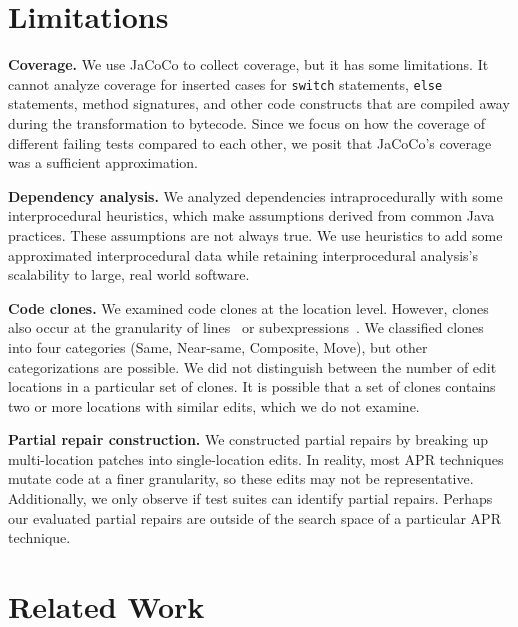 \documentclass[10pt, conference]{IEEEtran}
\begin{document}
\section{Limitations}
\label{sec:limits}

\noindent\textbf{Coverage.}
We use JaCoCo to collect coverage, but it has some
limitations. It cannot analyze coverage for inserted
cases for \texttt{switch} statements, \texttt{else} statements, method
signatures, and other code constructs that are compiled away during the
transformation to bytecode. Since we focus on how the coverage of different
failing tests compared to each other, we posit that JaCoCo's coverage was a
sufficient approximation.

\vspace{1ex}
\noindent\textbf{Dependency analysis.}
We analyzed dependencies intraprocedurally with some interprocedural 
heuristics, which make assumptions derived from common Java practices.
These assumptions are not always true. We use heuristics to add some
approximated interprocedural data while retaining interprocedural 
analysis's scalability to large, real world software.

\vspace{1ex}
\noindent\textbf{Code clones.}
We examined code clones at the location level.  However, clones also occur at the
granularity of lines~\cite{JiaClones} or
subexpressions~\cite{microclones}. We classified clones into four
categories (Same, Near-same, Composite, Move), but other categorizations 
are possible.
%
We did not distinguish between the number
of edit locations in a particular set of clones. It is possible that a set of
clones contains two or more locations with similar edits, which we do not examine. 

\vspace{1ex}
\noindent\textbf{Partial repair construction.}
We constructed partial repairs by breaking up multi-location patches
into single-location edits.
In reality, most APR techniques mutate code at a finer granularity, so
these edits may not be representative.  Additionally, we only observe if test suites
can identify partial repairs. Perhaps our evaluated partial repairs
are outside of the search space of a
particular APR technique.

\section{Related Work}
\label{sec:related}
\end{document}
